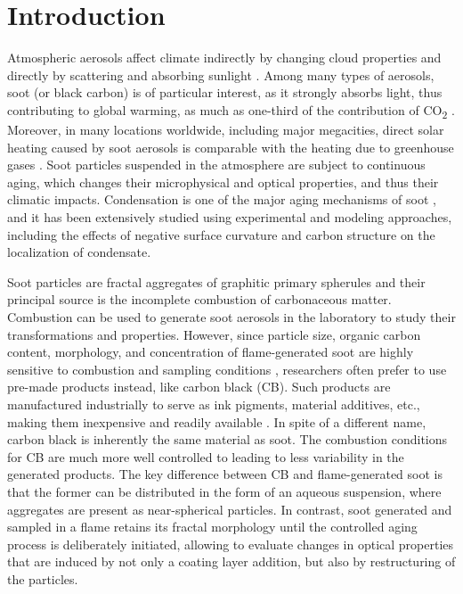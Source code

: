 \documentclass[12pt,authoryear]{elsarticle}
\begin{document}
\section{Introduction}
Atmospheric aerosols affect climate indirectly by changing cloud properties \citep{lohmann2005global,tao2012impact} and directly by scattering and absorbing sunlight \citep{chylek1995effect}. Among many types of aerosols, soot (or black carbon) is of particular interest, as it strongly absorbs light, thus contributing to global warming, as much as one-third of the contribution of CO\textsubscript{2} \citep{RN21}. Moreover, in many locations worldwide, including major megacities, direct solar heating caused by soot aerosols is comparable with the heating due to greenhouse gases \citep{RN45}. Soot particles suspended in the atmosphere are subject to continuous aging, which changes their microphysical and optical properties, and thus their climatic impacts. Condensation is one of the major aging mechanisms of soot \citep{saathoff2003coating}, and it has been extensively studied using experimental and modeling approaches, including the effects of negative surface curvature \citep{RN70,ivanova2020kinetic} and carbon structure \citep{ivanova2022molecular} on the localization of condensate.







Soot particles are fractal aggregates of graphitic primary spherules and their principal source is the incomplete combustion of carbonaceous matter. Combustion can be used to generate soot aerosols in the laboratory to study their transformations and properties. However, since particle size, organic carbon content, morphology, and concentration of flame-generated soot are highly sensitive to combustion and sampling conditions \citep{RN46,RN47}, researchers often prefer to use pre-made products instead, like carbon black (CB). Such products are manufactured industrially to serve as ink pigments, material additives, etc., making them inexpensive and readily available \citep{RN12}. In spite of a different name, carbon black is inherently the same material as soot. The combustion conditions for CB are much more well controlled to leading to less variability in the generated products. The key difference between CB and flame-generated soot is that the former can be distributed in the form of an aqueous suspension, where aggregates are present as near-spherical particles. In contrast, soot generated and sampled in a flame retains its fractal morphology until the controlled aging process is deliberately initiated, allowing to evaluate changes in optical properties that are induced by not only a coating layer addition, but also by restructuring of the particles. 
\end{document}

